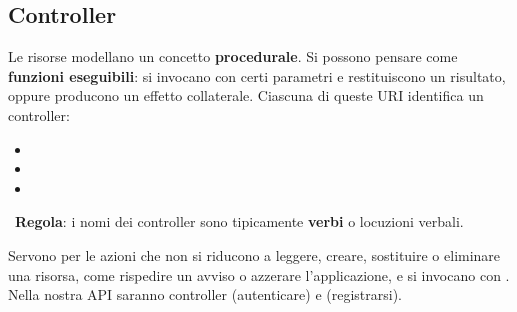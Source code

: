 \subsection{Controller}

Le risorse  modellano un concetto \textbf{procedurale}. Si
possono pensare come \textbf{funzioni eseguibili}: si invocano con certi
parametri e restituiscono un risultato, oppure producono un effetto collaterale.
Ciascuna di queste URI identifica un controller:

\begin{itemize}
  \item {}
  \item {}
  \item {}
\end{itemize}

\mok\ \textbf{Regola}: i nomi dei controller sono tipicamente \textbf{verbi} o
locuzioni verbali.

Servono per le azioni che non si riducono a leggere, creare, sostituire o
eliminare una risorsa, come rispedire un avviso o azzerare l'applicazione, e si
invocano con . Nella nostra API saranno controller 
(autenticare) e  (registrarsi).

